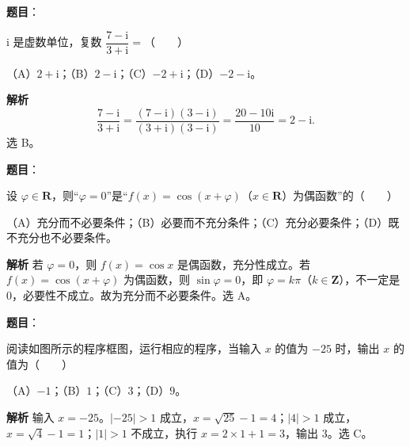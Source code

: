 
\begin{answer}

\textbf{题目}：

$\mathrm i$ 是虚数单位，复数 $\dfrac{7-\mathrm i}{3+\mathrm i}=$\mbox{（　　）}

（A）$2+\mathrm i$；（B）$2-\mathrm i$；（C）$-2+\mathrm i$；（D）$-2-\mathrm i$。

\textbf{解析}
\nopagebreak[4]
\[\frac{7-\mathrm i}{3+\mathrm i}=\frac{(7-\mathrm i)(3-\mathrm i)}{(3+\mathrm i)(3-\mathrm i)}=\frac{20-10\mathrm i}{10}=2-\mathrm i.\]
选 B。


\end{answer}
\begin{answer}

\textbf{题目}：

设 $\varphi\in\mathbf R$，则“$\varphi=0$”是“$f(x)=\cos(x+\varphi)$（$x\in\mathbf R$）为偶函数”的\mbox{（　　）}

（A）充分而不必要条件；（B）必要而不充分条件；（C）充分必要条件；（D）既不充分也不必要条件。

\textbf{解析}
若 $\varphi=0$，则 $f(x)=\cos x$ 是偶函数，充分性成立。若 $f(x)=\cos(x+\varphi)$ 为偶函数，则 $\sin\varphi=0$，即 $\varphi=k\pi$（$k\in\mathbf Z$），不一定是 $0$，必要性不成立。故为充分而不必要条件。选 A。


\end{answer}
\begin{answer}

\textbf{题目}：

阅读如图所示的程序框图，运行相应的程序，当输入 $x$ 的值为 $-25$ 时，输出 $x$ 的值为\mbox{（　　）}
\nopagebreak[4]
\begin{center}\end{center}
\nopagebreak[4]
（A）$-1$；（B）$1$；（C）$3$；（D）$9$。

\textbf{解析}
输入 $x=-25$。$|-25|>1$ 成立，$x=\sqrt{25}-1=4$；$|4|>1$ 成立，$x=\sqrt4-1=1$；$|1|>1$ 不成立，执行 $x=2\times1+1=3$，输出 $3$。选 C。


\end{answer}
